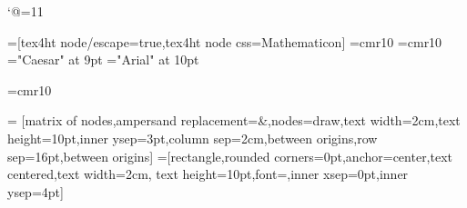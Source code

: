 \catcode`@=11\relax






\def\LD@Exercice@Display@Code{\LD@Option@@Label\qquad\eightpts}%
\LD@Exo@Label@Hide
\LD@Colors@Hide
\overfullrule=0pt%

	
\ifHtml
	
	=[tex4ht node/escape=true,tex4ht node css=Mathematicon]%
	\font\LD@Font@ResMathematica=cmr10%
	\font\LD@Font@Arial=cmr10%
\else
	\LD@AFour@Book
	\font\LD@Font@ResMathematica="Caesar" at 9pt
	\font\LD@Font@Arial="Arial" at 10pt
\fi


\def\pgfutil@EveryShipout@Output{%
  \setbox255=\vbox{%
    \setbox0=\hbox{\pgfutil@abe\pgfutil@abc\global\let\pgfutil@abc\pgfutil@empty}%
    \wd0=0pt%
    \ht0=0pt%
    \dp0=0pt%
    \box0%
    \makeheadline
    \unvbox255%
    \makefootline
  }%
  \pgfutil@@EveryShipout@Org@Shipout\box\@cclv%
}


\def\LD@Public@Star{PT*}%

\def\Red#1{#1}%
\def\Blue#1{#1}%
\def\pspicture#1\endpspicture{}%
\long\def\IGNORE#1\IGNORE{}%

\font\SvgText=cmr10\relax




\def\TipSection{}%
\def\Tip#1{\ifHtml\Par\fi\EA\sidx\EA{\TipSection!#1}}%

\def\LD@Index@List{%
	Th\'eor\`emes,Th\'eor\`eme,Formules,Formule,Propri\'et\'es,Propri\'et\'e,%
	In\'egalit\'es,In\'egalit\'e,Identit\'es,Identit\'e,In\'egalit\'es,In\'egalit\'e,%
	Distance,Intersection,Raisonnement,R\'ecurrence,Relations,Relation,Point,%
	Lien,Espaces vectoriels,Espace vectoriel,Suites,Interpr\'etation,%
	Fonctions,Produit,Loi,D\'eterminant,Principe,%
	Op\'erateur logique,Equation,Aire,Volume,Changement%
}%

= [matrix of nodes,ampersand replacement=\&,nodes={draw,text width=2cm,text height=10pt,inner ysep=3pt},column sep={2cm,between origins},row sep={16pt,between origins}]
=[rectangle,rounded corners=0pt,anchor=center,text centered,text width=2cm, text height=10pt,font=\SvgText,inner xsep=0pt,inner ysep=4pt]







